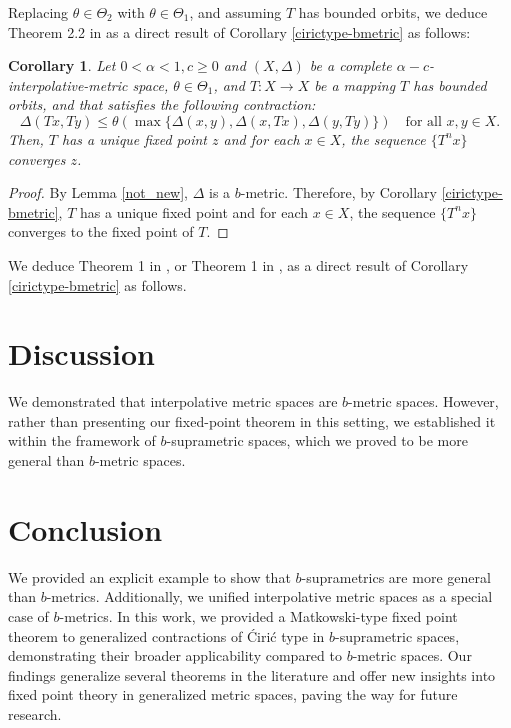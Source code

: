 \documentclass[pdflatex,sn-mathphys-num]{sn-jnl}%
\theoremstyle{thmstyleone}%
\newtheorem{cor}{Corollary}%
\theoremstyle{thmstyletwo}%
\theoremstyle{thmstylethree}%
\begin{document}
Replacing \(\theta \in \Theta_2\) with \(\theta \in \Theta_1\), and assuming $T$  has bounded orbits, we deduce  Theorem 2.2 in \cite{karapinar2025some} as a direct result of Corollary \ref{cirictype-bmetric} as follows:
\begin{cor}\label{gen-iterpol}
Let \(0<\alpha<1,c\ge0\) and \((X, \Delta)\) be a complete \(\alpha-c\)-interpolative-metric space, \(\theta\in \Theta_{1}\), and \(T : X \to X\) be a mapping $T$ has bounded orbits, and that satisfies the following contraction:
\begin{equation}\label{fee-interpol}
\Delta(Tx, Ty) \leq \theta(\max\{\Delta(x, y),\Delta(x, Tx),\Delta( y,Ty)\})\quad \text{for all } x,y \in X.
\end{equation}
Then, \(T\) has a unique fixed point \(z\) and for each \(x \in X\), the sequence \(\{T^n x\}\) converges \(z\).
\end{cor}
\begin{proof}By Lemma \ref{not_new}, $\Delta$ is a \(b\)-metric. Therefore, by Corollary \ref{cirictype-bmetric}, \(T\) has a unique fixed point and for each \(x \in X\), the sequence \(\{T^n x\}\) converges to the fixed point of \(T\).
\end{proof}
We deduce Theorem 1 in \cite{czerwik1993contraction}, or  Theorem 1 in \cite{kajanto2018note},  as a direct result of Corollary \ref{cirictype-bmetric} as follows.






\section{Discussion}\label{sec12}
We demonstrated that interpolative metric spaces are \( b \)-metric spaces. However, rather than presenting our fixed-point theorem in this setting, we established it within the framework of \(b\)-suprametric spaces, which we proved to be more general than \( b \)-metric spaces.

\section{Conclusion}
 We provided an explicit example to show that $b$-suprametrics are more general than $b$-metrics. Additionally, we unified interpolative metric spaces as a special case of $b$-metrics. In this work, we provided a Matkowski-type fixed point theorem to generalized contractions of \'{C}iri\'{c} type in $b$-suprametric spaces, demonstrating their broader applicability compared to $b$-metric spaces. Our findings generalize several theorems in the literature and offer new insights into fixed point theory in generalized metric spaces, paving the way for future research.
\backmatter
\end{document}
